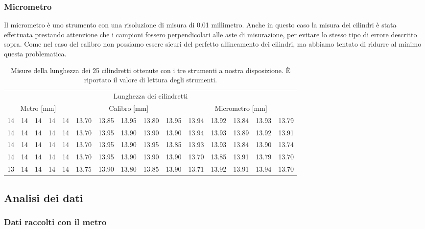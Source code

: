 \subsubsection{Micrometro}
Il micrometro è uno strumento con una risoluzione di misura di 0.01
millimetro. Anche in questo caso la misura dei cilindri è stata effettuata
prestando attenzione che i campioni fossero perpendicolari alle aste di
misurazione, per evitare lo stesso tipo di errore descritto sopra.
Come nel caso del calibro non possiamo essere sicuri del perfetto
allineamento dei cilindri, ma abbiamo tentato di ridurre al minimo
questa problematica.

\begin{table}[tb]
	\footnotesize
	\centering
	\begin{tabular} { c c c c c | c c c c c | c c c c c }
		\toprule
		\multicolumn{15}{c}{Lunghezza dei cilindretti} \\
		\multicolumn{5}{c}{Metro [mm]} & \multicolumn{5}{c}{Calibro [mm]} & \multicolumn{5}{c}{Micrometro [mm]} \\
		\midrule
		14 & 14 & 14 & 14 & 14 & 13.70 & 13.85 & 13.95 & 13.80 & 13.95 & 13.94 & 13.92 & 13.84 & 13.93 & 13.79 \\
		14 & 14 & 14 & 14 & 14 & 13.70 & 13.95 & 13.90 & 13.90 & 13.90 & 13.94 & 13.93 & 13.89 & 13.92 & 13.91 \\
		14 & 14 & 14 & 14 & 14 & 13.70 & 13.95 & 13.90 & 13.95 & 13.85 & 13.93 & 13.93 & 13.84 & 13.90 & 13.74 \\
		14 & 14 & 14 & 14 & 14 & 13.70 & 13.95 & 13.90 & 13.90 & 13.90 & 13.70 & 13.85 & 13.91 & 13.79 & 13.70 \\
		13 & 14 & 14 & 14 & 14 & 13.75 & 13.90 & 13.80 & 13.85 & 13.90 & 13.71 & 13.92 & 13.91 & 13.94 & 13.70 \\
	\bottomrule
	\end{tabular}
	\caption{Misure della lunghezza dei 25 cilindretti ottenute con i tre strumenti a nostra disposizione.
        È riportato il valore di lettura degli strumenti.}
	\label{tab:cilindretti}
\end{table}

\subsection{Analisi dei dati}

\subsubsection{Dati raccolti con il metro}

